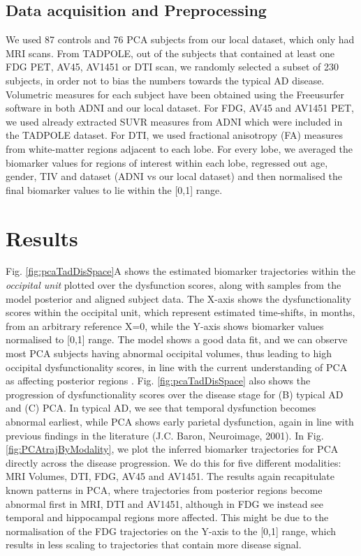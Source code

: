 \documentclass{llncs}
\begin{document}
\subsection{Data acquisition and Preprocessing}

We used 87 controls and 76 PCA subjects from our local dataset, which only had MRI scans. From TADPOLE, out of the subjects that contained at least one FDG PET, AV45, AV1451 or DTI scan, we randomly selected a subset of 230 subjects, in order not to bias the numbers towards the typical AD disease.  Volumetric measures for each subject have been obtained using the Freeusurfer software in both ADNI and our local dataset. For FDG, AV45 and AV1451 PET, we used already extracted SUVR measures from ADNI which were included in the TADPOLE dataset. For DTI, we used fractional anisotropy (FA) measures from white-matter regions adjacent to each lobe. For every lobe, we averaged the biomarker values for regions of interest within each lobe, regressed out age, gender, TIV and dataset (ADNI vs our local dataset) and then normalised the final biomarker values to lie within the [0,1] range.

\section{Results}

Fig. \ref{fig:pcaTadDisSpace}A shows the estimated biomarker trajectories within the \emph{occipital unit} plotted over the dysfunction scores, along with samples from the model posterior and aligned subject data. The X-axis shows the dysfunctionality scores within the occipital unit, which represent estimated time-shifts, in months, from an arbitrary reference X=0, while the Y-axis shows biomarker values normalised to [0,1] range. The model shows a good data fit, and we can observe most PCA subjects having abnormal occipital volumes, thus leading to high occipital dysfunctionality scores, in line with the current understanding of PCA as affecting posterior regions \cite{crutch2012posterior}. Fig. \ref{fig:pcaTadDisSpace} also shows the progression of dysfunctionality scores over the disease stage for (B) typical AD and (C) PCA. In typical AD, we see that temporal dysfunction becomes abnormal earliest, while PCA shows early parietal dysfunction, again in line with previous findings in the literature \cite{crutch2012posterior} (J.C. Baron, Neuroimage, 2001). In Fig. \ref{fig:PCAtrajByModality}, we plot the inferred biomarker trajectories for PCA directly across the disease progression. We do this for five different modalities: MRI Volumes, DTI, FDG, AV45 and AV1451. The results again recapitulate known patterns in PCA, where trajectories from posterior regions become abnormal first in MRI, DTI and AV1451, although in FDG we instead see temporal and hippocampal regions more affected. This might be due to the normalisation of the FDG trajectories on the Y-axis to the [0,1] range, which results in less scaling to trajectories that contain more disease signal. 
\end{document}
